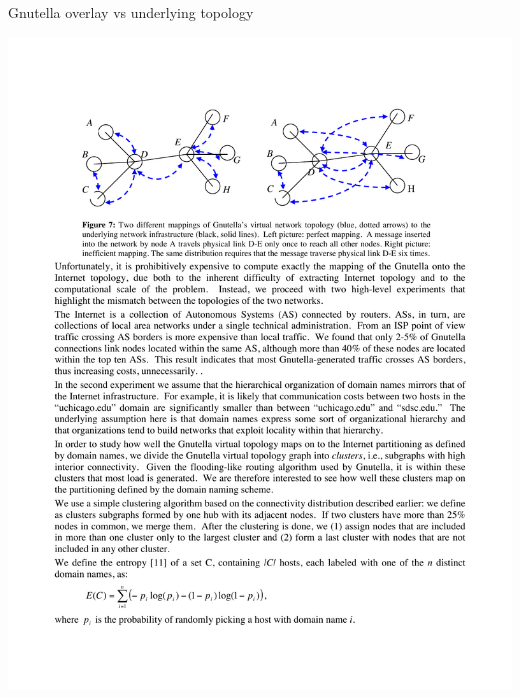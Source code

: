 \begin{frame}{Gnutella overlay vs underlying topology}
	
\includegraphics[width=\textwidth]{mapping3}	

\end{frame}

